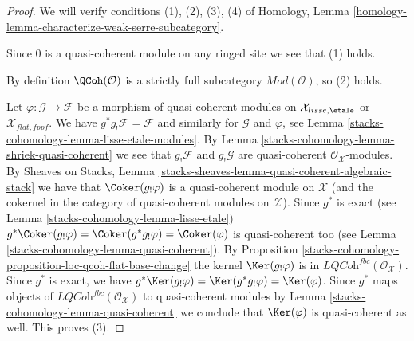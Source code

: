 \begin{proof}
We will verify conditions (1), (2), (3), (4) of
Homology, Lemma \ref{homology-lemma-characterize-weak-serre-subcategory}.

\medskip\noindent
Since $0$ is a quasi-coherent module on any ringed site we see that (1)
holds.

\medskip\noindent
By definition $\QCoh(\mathcal{O})$
is a strictly full subcategory $\textit{Mod}(\mathcal{O})$, so (2) holds.

\medskip\noindent
Let $\varphi : \mathcal{G} \to \mathcal{F}$ be a morphism of quasi-coherent
modules on $\mathcal{X}_{lisse,\etale}$ or $\mathcal{X}_{flat,fppf}$.
We have $g^*g_!\mathcal{F} = \mathcal{F}$ and similarly for
$\mathcal{G}$ and $\varphi$, see Lemma \ref{stacks-cohomology-lemma-lisse-etale-modules}.
By Lemma \ref{stacks-cohomology-lemma-shriek-quasi-coherent}
we see that $g_!\mathcal{F}$ and $g_!\mathcal{G}$ are quasi-coherent
$\mathcal{O}_\mathcal{X}$-modules. By Sheaves on Stacks, Lemma
\ref{stacks-sheaves-lemma-quasi-coherent-algebraic-stack}
we have that $\Coker(g_!\varphi)$ is a quasi-coherent
module on $\mathcal{X}$ (and the cokernel in the category
of quasi-coherent modules on $\mathcal{X}$).
Since $g^*$ is exact (see Lemma \ref{stacks-cohomology-lemma-lisse-etale})
$g^*\Coker(g_!\varphi) = \Coker(g^*g_!\varphi) = \Coker(\varphi)$
is quasi-coherent too (see Lemma \ref{stacks-cohomology-lemma-quasi-coherent}).
By Proposition \ref{stacks-cohomology-proposition-loc-qcoh-flat-base-change}
the kernel $\Ker(g_!\varphi)$ is in
$\textit{LQCoh}^{fbc}(\mathcal{O}_\mathcal{X})$.
Since $g^*$ is exact, we have
$g^*\Ker(g_!\varphi) = \Ker(g^*g_!\varphi) = \Ker(\varphi)$.
Since $g^*$ maps objects of
$\textit{LQCoh}^{fbc}(\mathcal{O}_\mathcal{X})$ to quasi-coherent
modules by Lemma \ref{stacks-cohomology-lemma-quasi-coherent} we conclude that
$\Ker(\varphi)$ is quasi-coherent as well. This proves (3).


\end{proof}
